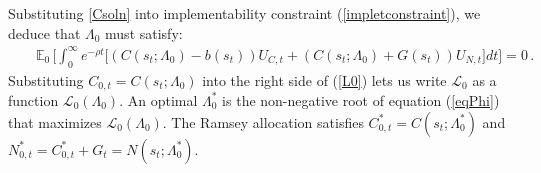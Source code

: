 \documentclass[12pt]{article}
\DeclareMathOperator*{\argmax}{arg\,max}
\newcommand{\NW}[1]{{\textcolor{blue}{#1}}}
\newcommand{\WJ}[1]{{\textcolor{red}{#1}}}
\begin{document}
Substituting  \eqref{Csoln} into  implementability constraint (\ref{impletconstraint}),  we deduce that   %
$\Lambda_0$ must satisfy: 
\begin{eqnarray}\label{eqPhi}
	&& \mathbb{E}_0 \, \bigg[ \int_{0}^{\infty} e^{-\rho t} \big[ \left( C(s_t; \Lambda_0)-b(s_t)\right)U_{C, t}+(C(s_t; \Lambda_0)+G(s_t))U_{N, t} \big]dt  \bigg] = 0\,. %
\end{eqnarray}
Substituting  $C_{0,t} = C(s_t; \Lambda_0)$ into the right side of   (\ref{L0}) lets us  write  $\mathcal L_0$ as a function %
 $\mathcal{L}_0(\Lambda_0)$. 
An optimal  $\Lambda_0^{*}$ is  the non-negative root of equation (\ref{eqPhi}) that maximizes $\mathcal{L}_0(\Lambda_0)$. 
The Ramsey allocation satisfies $C_{0,t}^*=C(s_t; \Lambda_0^\ast)$ and $N_{0,t}^* = C_{0,t}^*+G_t = N(s_t; \Lambda_0^\ast)$. 
\end{document}
